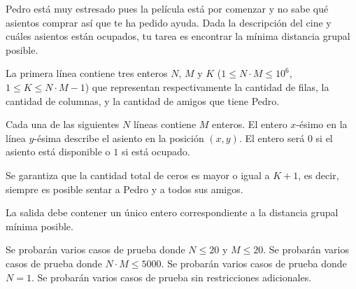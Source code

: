 \documentclass{oci}
\newcommand{\cine}{
    \fill[black] (1,3) rectangle (2,4);
    \fill[black] (2,3) rectangle (3,4);
    \fill[black] (3,3) rectangle (4,4);

    \fill[black] (0,2) rectangle (1,3);
    \fill[black] (3,2) rectangle (4,3);
    \fill[black] (4,2) rectangle (5,3);

    \fill[black] (0,1) rectangle (1,2);
    \fill[black] (1,1) rectangle (2,2);
    \fill[black] (2,1) rectangle (3,2);
    \fill[black] (4,1) rectangle (5,2);

    \fill[black] (2,0) rectangle (3,1);
    \fill[black] (4,0) rectangle (5,1);


    \foreach \x in {1, 2, 3, 4, 5} {
        \node[above] at (\x-1+0.5, 4) {\small\x};
    }
    \foreach \y in {1, 2, 3, 4} {
        \node[left] at (0, 4-\y+0.5) {\small\y};
    }
    \draw (0,0) grid (5,4);
}
\begin{document}
\begin{problemDescription}
\begin{figure}[h]
    \end{figure}

    Pedro está muy estresado pues la película está por comenzar y
    no sabe qué asientos comprar así que te ha pedido ayuda.
    Dada la descripción del cine y cuáles asientos están ocupados,
    tu tarea es encontrar la mínima distancia grupal posible.

\end{problemDescription}

\begin{inputDescription}
La primera línea contiene tres enteros $N$, $M$ y $K$
($1 \leq N \cdot M \leq 10^6$, $1 \leq K \leq N \cdot M - 1$)
que representan respectivamente la cantidad de filas, la cantidad de columnas,
y la cantidad de amigos que tiene Pedro.

Cada una de las siguientes $N$ líneas contiene $M$ enteros.
%
El entero $x$-ésimo en la línea $y$-ésima describe el asiento
en la posición $(x, y)$.
%
El entero será $0$ si el asiento está disponible o $1$ si
está ocupado.

Se garantiza que la cantidad total de ceros es mayor o igual a $K+1$,
es decir, siempre es posible sentar a Pedro y a todos sus amigos.
\end{inputDescription}

\begin{outputDescription}
La salida debe contener un único entero correspondiente
a la distancia grupal mínima posible.
\end{outputDescription}

\begin{scoreDescription}
   Se probarán varios casos de prueba donde $N\leq 20$ y $M \leq 20$.
   Se probarán varios casos de prueba donde $N \cdot M \leq 5000$.
   Se probarán varios casos de prueba donde $N = 1$.
   Se probarán varios casos de prueba sin restricciones adicionales.
\end{scoreDescription}

\begin{sampleDescription}
\end{sampleDescription}
\end{document}
